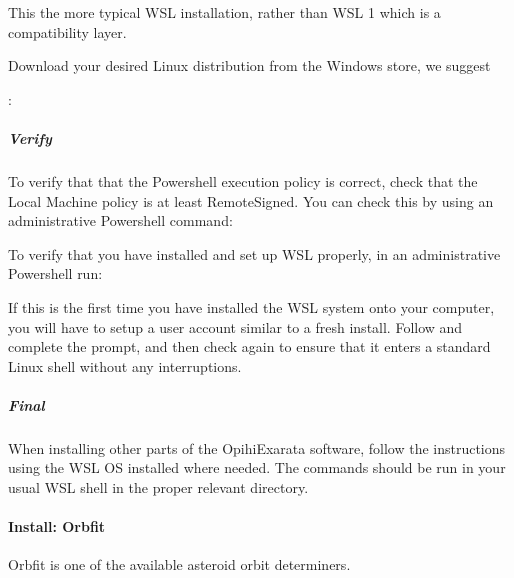 \documentclass[letterpaper,11pt,english]{sphinxmanual}
\begin{document}
\sphinxAtStartPar
This the more typical WSL installation, rather than WSL 1 which is a
compatibility layer.

\sphinxAtStartPar
{}

\sphinxAtStartPar
Download your desired Linux distribution from the Windows store, we
suggest %
\begin{footnote}[36]\sphinxAtStartFootnote
{}
%
\end{footnote}:


\subparagraph{Verify}
\label{\detokenize{technical/installation/windows:verify}}
\sphinxAtStartPar
To verify that that the Powershell execution policy is correct, check that
the Local Machine policy is at least RemoteSigned. You can check this by using
an administrative Powershell command:

\begin{sphinxVerbatim}[commandchars=\\\{\}]
 
\end{sphinxVerbatim}

\sphinxAtStartPar
To verify that you have installed and set up WSL properly, in an administrative Powershell run:

\begin{sphinxVerbatim}[commandchars=\\\{\}]
\end{sphinxVerbatim}

\sphinxAtStartPar
If this is the first time you have installed the WSL system onto your computer,
you will have to setup a user account similar to a fresh install. Follow and
complete the prompt, and then check  again to ensure that it
enters a standard Linux shell without any interruptions.


\subparagraph{Final}
\label{\detokenize{technical/installation/windows:final}}
\sphinxAtStartPar
When installing other parts of the OpihiExarata software, follow the
instructions using the WSL OS installed where needed. The commands should be
run in your usual WSL shell in the proper relevant directory.

\sphinxstepscope


\paragraph{Install: Orbfit}
\label{\detokenize{technical/installation/orbfit:install-orbfit}}\label{\detokenize{technical/installation/orbfit:technical-installation-orbfit}}\label{\detokenize{technical/installation/orbfit::doc}}
\sphinxAtStartPar
Orbfit is one of the available asteroid orbit determiners.
\end{document}
